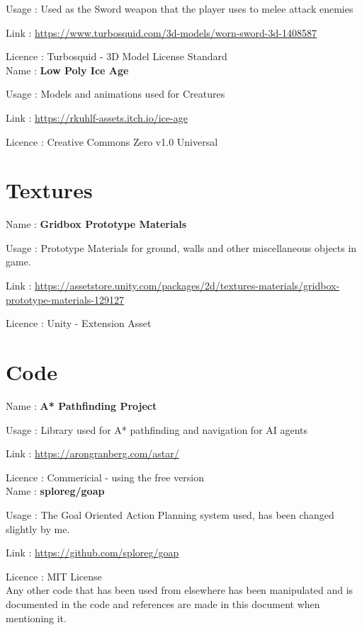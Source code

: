 \documentclass[11pt]{report}
\begin{document}
Usage : Used as the Sword weapon that the player uses to melee attack enemies

Link : \url{https://www.turbosquid.com/3d-models/worn-sword-3d-1408587}

Licence : Turbosquid - 3D Model License Standard  
\\

Name : \textbf{Low Poly Ice Age}

Usage : Models and animations used for Creatures

Link : \url{https://rkuhlf-assets.itch.io/ice-age}

Licence : Creative Commons Zero v1.0 Universal
\\


\section{Textures}
Name : \textbf{Gridbox Prototype Materials}

Usage : Prototype Materials for ground, walls and other miscellaneous objects in game.

Link : \url{https://assetstore.unity.com/packages/2d/textures-materials/gridbox-prototype-materials-129127}

Licence : Unity - Extension Asset

\section{Code}
Name : \textbf{A* Pathfinding Project}

Usage : Library used for A* pathfinding and navigation for AI agents

Link : \url{https://arongranberg.com/astar/}

Licence : Commericial - using the free version
\\

Name : \textbf{sploreg/goap}

Usage : The Goal Oriented Action Planning system used, has been changed slightly by me.

Link : \url{https://github.com/sploreg/goap}

Licence : MIT License 
\\

Any other code that has been used from elsewhere has been manipulated and is documented in the code and references are made in this document when mentioning it.
\end{document}
